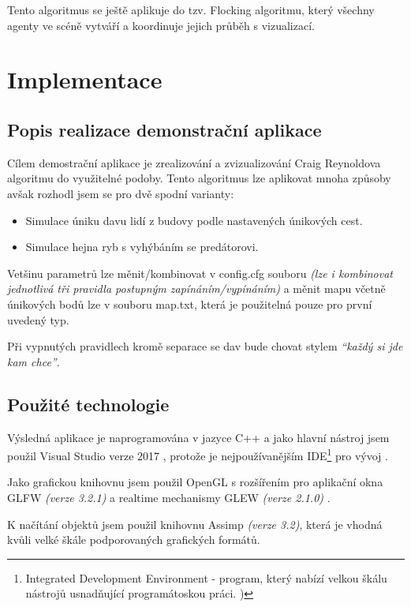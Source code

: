 \documentclass[czech,public,dept460,male,cpdeclaration]{diploma}
\begin{document}
Tento algoritmus se ještě aplikuje do tzv. Flocking algoritmu, který všechny agenty ve scéně vytváří a koordinuje jejich průběh s vizualizací.

\newpage
\section{Implementace}

\subsection{Popis realizace demonstrační aplikace}
Cílem demostrační aplikace je zrealizování a zvizualizování Craig Reynoldova algoritmu do využitelné podoby. Tento algoritmus lze aplikovat mnoha způsoby avšak rozhodl jsem se pro dvě spodní varianty:

\begin{itemize}
	\item Simulace úniku davu lidí z budovy podle nastavených únikových cest.
	\item Simulace hejna ryb s vyhýbáním se predátorovi.
\end{itemize}

Vetšinu parametrů lze měnit/kombinovat v config.cfg souboru \textit{(lze i kombinovat jednotlivá tři pravidla postupným zapínáním/vypínáním)} a měnit mapu včetně únikových bodů lze v souboru map.txt, která je použitelná pouze pro první uvedený typ.

Při vypnutých pravidlech kromě separace se dav bude chovat stylem \textit{``každý si jde kam chce''}.

\subsection{Použité technologie}
Výsledná aplikace je naprogramována v jazyce C++ a jako hlavní nástroj jsem použil Visual Studio verze 2017 \cite{linkToVisualStudio}, protože je nejpoužívanějším IDE\footnote{Integrated Development Environment - program, který nabízí velkou škálu nástrojů usnadňující programátoskou práci. \cite{linkToIDE})} pro vývoj \cite{linkToTopIDE}. 

Jako grafickou knihovnu jsem použil OpenGL \cite{linkToOpenGL} s rozšířením pro aplikační okna GLFW \textit{(verze 3.2.1)} \cite{linkToGLFW} a realtime mechanismy GLEW \textit{(verze 2.1.0)} \cite{linkToGLew}.

K načítání objektů jsem použil knihovnu Assimp \cite{linkToAssimp} \textit{(verze 3.2)}, která je vhodná kvůli velké škále podporovaných grafických formátů.
\end{document}

